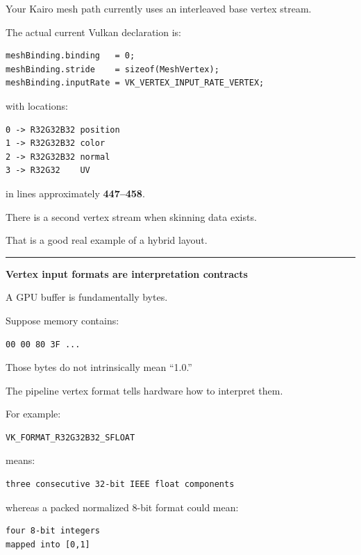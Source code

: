 Your Kairo mesh path currently uses an interleaved base vertex stream.

The actual current Vulkan declaration is:

\begin{verbatim}
meshBinding.binding   = 0;
meshBinding.stride    = sizeof(MeshVertex);
meshBinding.inputRate = VK_VERTEX_INPUT_RATE_VERTEX;
\end{verbatim}

with locations:

\begin{verbatim}
0 -> R32G32B32 position
1 -> R32G32B32 color
2 -> R32G32B32 normal
3 -> R32G32    UV
\end{verbatim}

in  lines approximately \textbf{447--458}.

There is a second vertex stream when skinning data exists.

That is a good real example of a hybrid layout.

\begin{center}\rule{0.5\linewidth}{0.5pt}\end{center}

\textbf{Vertex input formats are interpretation contracts}

A GPU buffer is fundamentally bytes.

Suppose memory contains:

\begin{verbatim}
00 00 80 3F ...
\end{verbatim}

Those bytes do not intrinsically mean ``1.0.''

The pipeline vertex format tells hardware how to interpret them.

For example:

\begin{verbatim}
VK_FORMAT_R32G32B32_SFLOAT
\end{verbatim}

means:

\begin{verbatim}
three consecutive 32-bit IEEE float components
\end{verbatim}

whereas a packed normalized 8-bit format could mean:

\begin{verbatim}
four 8-bit integers
mapped into [0,1]
\end{verbatim}

